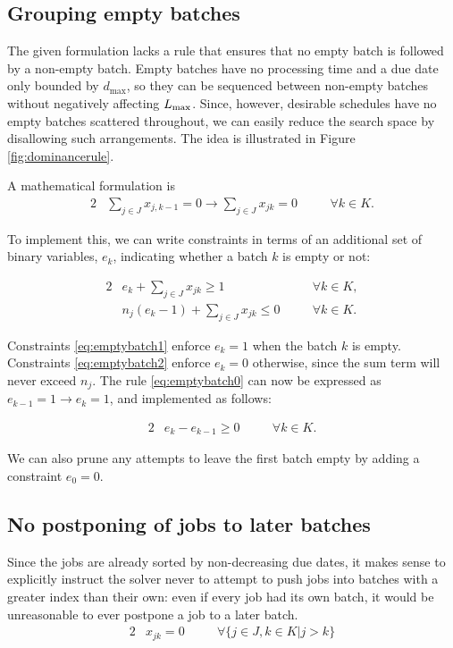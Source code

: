 \subsection{Grouping empty batches} The given
formulation lacks a rule that ensures that no empty batch is followed by a
non-empty batch. Empty batches have no processing time and a due date only
bounded by $d_\text{max}$, so they can be sequenced between non-empty batches
without negatively affecting $L_{\text{max}}$. Since, however, desirable schedules have
no empty batches scattered throughout, we can easily reduce the search space by
disallowing such arrangements. The idea is illustrated in Figure
\ref{fig:dominancerule}.



A mathematical formulation is
\begin{alignat}{2}
& \sum_{j \in J} x_{j,k-1} = 0 \rightarrow \sum_{j \in J} x_{jk} = 0 \quad && \forall k \in K. \label{eq:emptybatch0}
\end{alignat}

To implement this, we can write constraints in terms of an additional  set of binary variables, $e_k$, indicating whether a batch $k$ is empty or not:

\begin{alignat}{2}
& e_k + \sum_{j \in J} x_{jk} \geq 1 \quad && \forall k \in K, \label{eq:emptybatch1} \\
& n_j (e_k-1) + \sum_{j \in J} x_{jk} \leq 0 \quad && \forall k \in K. \label{eq:emptybatch2}
\end{alignat}

Constraints \eqref{eq:emptybatch1} enforce $e_k = 1$ when the batch $k$ is
empty. Constraints \eqref{eq:emptybatch2} enforce $e_k = 0$ otherwise, since the sum term will never exceed $n_j$. The rule \ref{eq:emptybatch0} can now be expressed as $e_{k-1} = 1 \rightarrow e_k = 1$, and implemented as follows:

\begin{alignat}{2}
& e_k - e_{k-1} \geq 0 \quad && \forall k \in K.
\end{alignat}

We can also prune any attempts to leave the first batch empty by adding a constraint $e_0 = 0$.


\subsection{No postponing of jobs to later batches}
Since the jobs are already sorted by non-decreasing due dates, it makes sense to explicitly instruct the solver never to attempt to push jobs into batches with a greater index than their own: even if every job had its own batch, it would be unreasonable to ever postpone a job to a later batch.
\begin{alignat}{2}
  & x_{jk} = 0 \quad && \forall \{j \in J, k \in K | j > k \}
\end{alignat}

